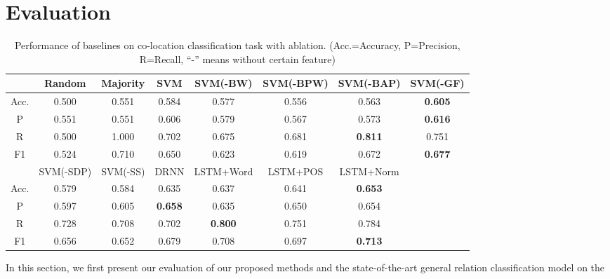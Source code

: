 \section {Evaluation}
\label{sec:eval}
\begin{table*}[th]
	\centering
	\small
	\begin{tabular}{|c|c|c|c|c|c|c|c|}
			\hline
			& Random       & Majority    & SVM  & SVM(-BW)    & SVM(-BPW) & SVM(-BAP)   & SVM(-GF)    \\ \hline
			Acc.  & 0.500        & 0.551       & 0.584                                & 0.577          & 0.556        & 0.563          & \textbf{0.605} \\ \hline
			P & 0.551        & 0.551       & 0.606                                & 0.579          & 0.567        & 0.573          & \textbf{0.616} \\ \hline
			R    & 0.500        & 1.000       & 0.702                                & 0.675          & 0.681        & \textbf{0.811} & 0.751          \\ \hline
			F1        & 0.524        & 0.710       & 0.650                                & 0.623          & 0.619        & 0.672          & \textbf{0.677} \\ \hline \hline
			& SVM(-SDP) & SVM(-SS) & DRNN & LSTM+Word    & LSTM+POS   & LSTM+Norm    &                \\ \hline
			Acc.  & 0.579        & 0.584       & 0.635                                & 0.637          & 0.641        & \textbf{0.653} &                \\ \hline
			P & 0.597        & 0.605       & \textbf{0.658}                       & 0.635          & 0.650        & 0.654          &                \\ \hline
			R    & 0.728        & 0.708       & 0.702                                & \textbf{0.800} & 0.751        & 0.784          &                \\ \hline
			F1        & 0.656        & 0.652       & 0.679                                & 0.708          & 0.697        & \textbf{0.713} &                \\ \hline
		\end{tabular}
	\caption{Performance of baselines on co-location classification task with ablation. (Acc.=Accuracy, P=Precision, R=Recall, ``-'' means without certain feature)}
	\label{tab:aprf}
\end{table*}
In this section, we first present our evaluation of our proposed methods and the state-of-the-art general relation classification model on the 
